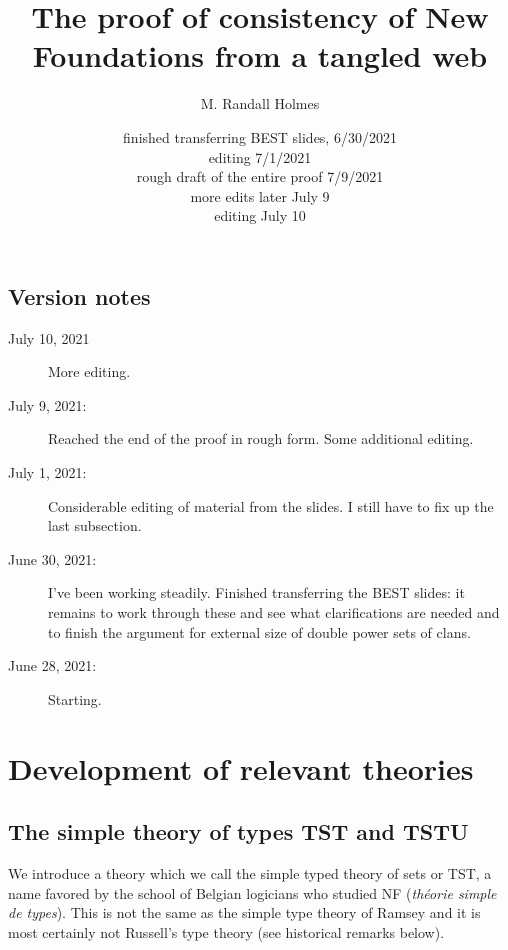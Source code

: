 \documentclass[12pt]{article}
\title{The proof of consistency of New Foundations from a tangled web}
\author{M. Randall Holmes}
\date{finished transferring BEST slides, 6/30/2021 \\ editing 7/1/2021 \\ rough draft of the entire proof 7/9/2021 \\ more edits later July 9 \\editing July 10}
\begin{document}
\maketitle

\maketitle

\newpage

\subsection{Version notes}

\begin{description}

\item[July 10, 2021]  More editing.

\item[July 9, 2021:]  Reached the end of the proof in rough form.  Some additional editing.

\item[July 1, 2021:]  Considerable editing of material from the slides.  I still have to fix up the last subsection.

\item[June 30, 2021:]  I've been working steadily.  Finished transferring the BEST slides:  it remains to work through these and see what clarifications are needed and to finish the
argument for external size of double power sets of clans.

\item[June 28, 2021:]  Starting.



\end{description}


\newpage

\tableofcontents

\newpage

\section{Development of relevant theories}

\subsection{The simple theory of types TST and TSTU}

We introduce a theory which we call the simple typed theory of sets or TST, a name favored by the school of Belgian logicians who studied NF ({\em th\'eorie simple de types}).  This is not the same as the simple type theory of Ramsey and it is most certainly not Russell's type theory  (see historical remarks below).
\end{document}
